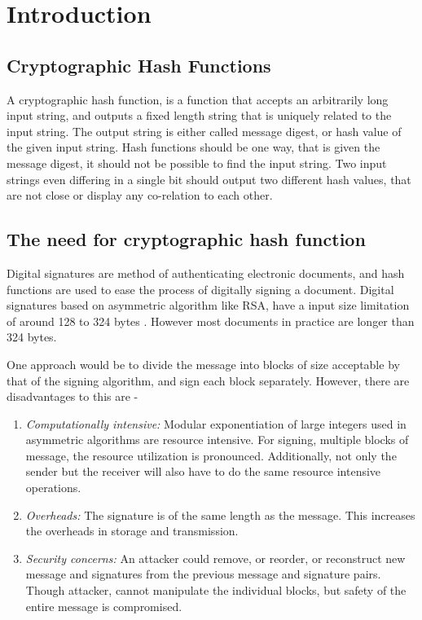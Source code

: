 \chapter{Introduction}

\section{Cryptographic Hash Functions}

A cryptographic hash function, is a function that accepts an arbitrarily long input string, and outputs
a fixed length string that is uniquely related to the input string. The output string is either called message
digest, or hash value of the given input string. Hash functions should be one way, that is given the message
digest, it should not be possible to find the input string. Two input strings even differing in a single
bit should output two different hash values, that are not close or display any co-relation to each other.

\section{The need for cryptographic hash function} 

Digital signatures are method of authenticating electronic documents, and hash functions are used to ease the
process of digitally signing a document. Digital signatures based on asymmetric algorithm like RSA, have a input 
size limitation of around 128 to 324 bytes \cite{00017}. However most documents in practice are longer
than 324 bytes.

One approach would be to divide the message into blocks of size acceptable by that of the signing 
algorithm, and sign each block separately. However, there are disadvantages to this are -

\begin{enumerate}
  \item \emph{Computationally intensive:} Modular exponentiation of large integers used in asymmetric
  algorithms are resource intensive. For signing, multiple blocks of message, the resource utilization
  is pronounced. Additionally, not only the sender but the receiver will also have to do the same resource
  intensive operations.
  \item \emph{Overheads:} The signature is of the same length as the message. This increases the overheads
  in storage and transmission.
  \item \emph{Security concerns:} An attacker could remove, or reorder, or reconstruct new message and 
  signatures from the previous message and signature pairs. Though attacker, cannot manipulate the individual
  blocks, but safety of the entire message is compromised.
\end{enumerate}

